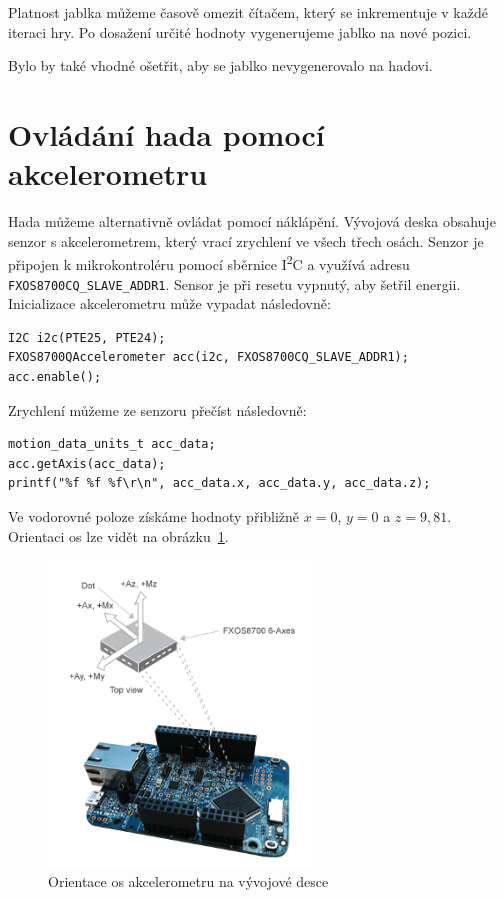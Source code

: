 \documentclass[12pt]{article}
\newcommand{\twi}{I\textsuperscript{2}C}
\begin{document}
Platnost jablka můžeme časově omezit čítačem, který se inkrementuje v každé iteraci hry.
Po dosažení určité hodnoty vygenerujeme jablko na nové pozici.

Bylo by také vhodné ošetřit, aby se jablko nevygenerovalo na hadovi.

\section{Ovládání hada pomocí akcelerometru}
Hada můžeme alternativně ovládat pomocí náklápění.
Vývojová deska obsahuje senzor s akcelerometrem, který vrací zrychlení ve všech třech osách.
Senzor je připojen k mikrokontroléru pomocí sběrnice \twi{} a využívá adresu \texttt{FXOS8700CQ\_SLAVE\_ADDR1}.
Sensor je při resetu vypnutý, aby šetřil energii.
Inicializace akcelerometru může vypadat následovně:
\begin{verbatim}
I2C i2c(PTE25, PTE24);
FXOS8700QAccelerometer acc(i2c, FXOS8700CQ_SLAVE_ADDR1);
acc.enable();
\end{verbatim}

Zrychlení můžeme ze senzoru přečíst následovně:
\begin{verbatim}
motion_data_units_t acc_data;
acc.getAxis(acc_data);
printf("%f %f %f\r\n", acc_data.x, acc_data.y, acc_data.z);
\end{verbatim}
Ve vodorovné poloze získáme hodnoty přibližně $ x = 0$, $y = 0$ a $z = 9,81 $.
Orientaci os lze vidět na obrázku~\ref{fig:axes}.

\begin{figure}[ht]
  \centering
  \includegraphics[width=7cm]{figures/axis}
  \caption[]{Orientace os akcelerometru na vývojové desce\footnotemark}
  \label{fig:axes}
\end{figure}
\end{document}
